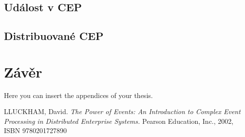 \documentclass[
  digital, %
  table,   %
  nolof,     %
  nolot,     %
  twoside,
  nocover,
  monochrome,
  12pt
]{fithesis3}
\begin{document}
\section{Událost v CEP}
\section{Distribuované CEP}


\chapter{Závěr}
Here you can insert the appendices of your thesis.

\begin{thebibliography}{99}
\bibitem
LLUCKHAM, David. \textit{The Power of Events: An Introduction to Complex
Event Processing in Distributed Enterprise Systems.} Pearson
Education, Inc., 2002, ISBN 9780201727890 \label{bib_1}
\end{thebibliography}

\appendix %
\end{document}
